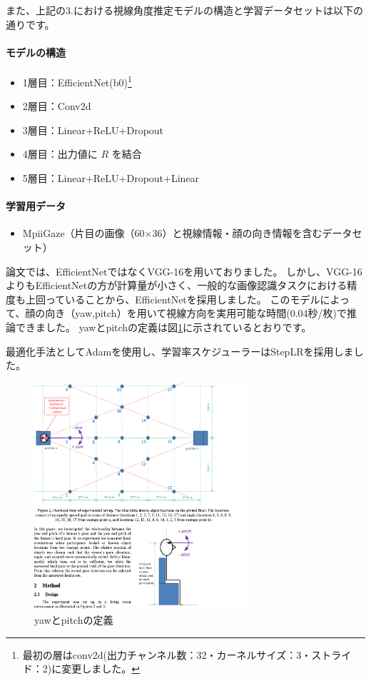また、上記の3.における視線角度推定モデルの構造と学習データセットは以下の通りです。

\paragraph{モデルの構造}
\begin{itemize}
    \item 1層目：EfficientNet(b0)\footnote{最初の層はconv2d(出力チャンネル数：32・カーネルサイズ：3・ストライド：2)に変更しました。}
    \item 2層目：Conv2d
    \item 3層目：Linear+ReLU+Dropout
    \item 4層目：出力値に $R$ を結合
    \item 5層目：Linear+ReLU+Dropout+Linear
\end{itemize}

\paragraph{学習用データ}
\begin{itemize}
    \item MpiiGaze（片目の画像（60×36）と視線情報・顔の向き情報を含むデータセット）
\end{itemize}

論文\cite{zhang2017mpiigaze}では、EfficientNetではなくVGG-16を用いておりました。
しかし、VGG-16よりもEfficientNetの方が計算量が小さく、一般的な画像認識タスクにおける精度も上回っていることから、EfficientNetを採用しました。
このモデルによって、顔の向き（yaw,pitch）を用いて視線方向を実用可能な時間(0.04秒/枚)で推論できました。
yawとpitchの定義は図\ref{fig:yaw_pitch_measurement}に示されているとおりです。

最適化手法としてAdamを使用し、学習率スケジューラーはStepLRを採用しました。

\begin{figure}[htbp]
    \centering
    \includegraphics[width=0.7\textwidth]{eye-track-cursor/fig/gaze_definition.png}
    \caption{yawとpitchの定義}
    \label{fig:yaw_pitch_measurement}
\end{figure}

